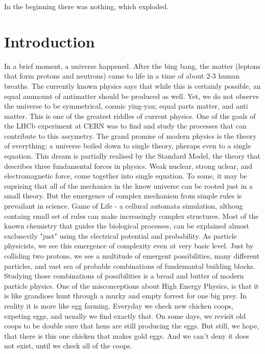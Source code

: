 \begin{savequote}[75mm]
In the beginning there was nothing, which exploded.
\end{savequote}

\chapter{Introduction}
\label{introduction}

In a brief moment, a universe happened. After the bing bang, the matter (leptons that form protons and neutrons) came to life in a time of about 2-3  human breaths. The currently known physics says that while this is certainly possible, an equal ammount of antimatter should be produced as well. Yet, we do not observe the universe to be symmetrical, cosmic ying-yan; equal parts matter, and anti matter. This is one of the greatest riddles of current physics. One of the goals of the LHCb experiment at CERN was to find and study the processes that can contribute to this assymetry. 
The grand promise of modern physics is the theory of everything; a universe boiled down to single theory, pheraps even to a single equation. This dream is partially realised by the Standard Model, the theory that describes three fundamental forces in physics. Weak nuclear, strong uclear, and electromagnetic force, come together into single equation. To some, it may be suprising that all of the mechanics in the know universe can be rooted just in a small theory. But the emergence of complex mechanism from simple rules is prevailant in science. Game of Life - a cellural automata simulation, althoug containg small set of rules can make increasingly complex structures. Most of the known chemistry that guides the biological processes, can be explained almost exclusevily "just" using the electrical potential and probability.
As particle physicists, we see this emergence of complexity even at very basic level. Just by colliding two protons, we see a multitude of emergent possibilities, many different particles, and vast sea of probable combinations of fundemantal building blocks. Studying those combinations of possibilities is a bread and butter of modern particle physics. One of the misconceptions about High Energy Physics, is that it is like grandiose hunt through a murky and empty forrest for one big prey. In reality it is more like egg farming. Everyday we check new chicken coops, expeting eggs, and usually we find exactly that. On some days, we revisit old coops to be double sure that hens are still producing the eggs. But still, we hope, that there is this one chicken that makes gold eggs. And we can't deny it does not exist, until we check all of the coops.

